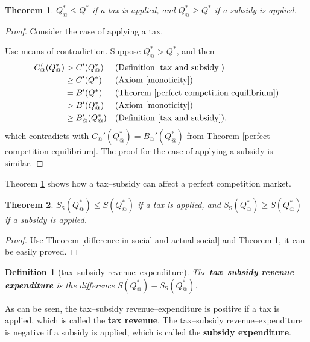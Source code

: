 \documentclass{article}
\newtheorem{theorem}{Theorem}[subsection]
\newtheorem{definition}{Definition}[subsection]
\begin{document}
\begin{theorem}
\label{effect of tax and subsidy}
$Q_@^*\le Q^*$ if a tax is applied, and $Q_@^*\ge Q^*$ if a subsidy is applied.
\end{theorem}
\begin{proof}
Consider the case of applying a tax.

Use means of contradiction.
Suppose $Q_@^*>Q^*$, and then
\begin{align*}
C_@'\!\left(Q_@^*\right)&>C'\!\left(Q_@^*\right)&&\text{(Definition \ref{tax and subsidy})}\\
&\ge C'\!\left(Q^*\right)&&\text{(Axiom \ref{monoticity})}\\
&=B'\!\left(Q^*\right)&&\text{(Theorem \ref{perfect competition equilibrium})}\\\
&>B'\!\left(Q_@^*\right)&&\text{(Axiom \ref{monoticity})}\\
&\ge B_@'\!\left(Q_@^*\right)&&\text{(Definition \ref{tax and subsidy})},
\end{align*}
which contradicts with $C_@'\!\left(Q_@^*\right)=B_@'\!\left(Q_@^*\right)$ from Theorem \ref{perfect competition equilibrium}.
The proof for the case of applying a subsidy is similar.
\end{proof}

Theorem \ref{effect of tax and subsidy} shows how a tax--subsidy can affect a perfect competition market.

\begin{theorem}
$S_\mathrm S\!\left(Q_@^*\right)\le S\!\left(Q_@^*\right)$ if a tax is applied, and $S_\mathrm S\!\left(Q_@^*\right)\ge S\!\left(Q_@^*\right)$ if a subsidy is applied.
\end{theorem}
\begin{proof}
Use Theorem \ref{difference in social and actual social} and Theorem \ref{effect of tax and subsidy}, it can be easily proved.
\end{proof}

\begin{definition}[tax--subsidy revenue--expenditure]
The \textbf{tax--subsidy revenue--expenditure} is the difference $S\!\left(Q_@^*\right)-S_\mathrm S\!\left(Q_@^*\right)$.
\end{definition}

As can be seen, the tax--subsidy revenue--expenditure is positive if a tax is applied, which is called the \textbf{tax revenue}.
The tax--subsidy revenue--expenditure is negative if a subsidy is applied, which is called the \textbf{subsidy expenditure}.
\end{document}
